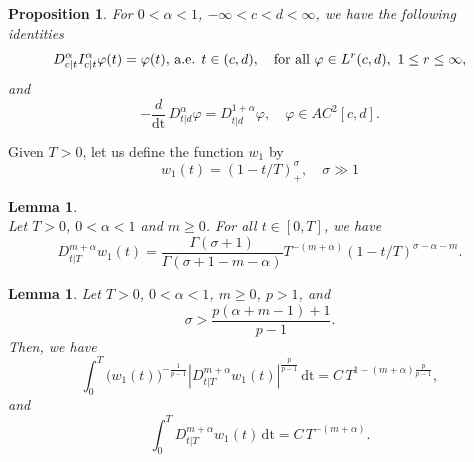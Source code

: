 \documentclass[reqno,11pt]{amsart}
\newtheorem{proposition}[theorem]{Proposition}
\newtheorem{lemma}[theorem]{Lemma}
\numberwithin{equation}{section}
\begin{document}
\begin{proposition}
	For $0<\alpha<1$, $-\infty<c<d<\infty$, we have the following identities
	\begin{equation}\label{Int3}
		D^\alpha_{c|t}I^\alpha_{c|t}\varphi(t)=\varphi(t),\,\hbox{a.e. $t\in(c,d)$}, \quad\hbox{for all}\,\,\varphi\in L^r(c,d),\,\, 1\leq r\leq\infty,
	\end{equation}
	and
	\begin{equation}\label{Int4}
		-\frac{d}{\mathrm{dt}} \, D^\alpha_{t|d}\varphi=D^{1+\alpha}_{t|d}\varphi,\quad \varphi\in AC^2[c,d].
	\end{equation}
\end{proposition}

Given $T>0$, let us define the function $w_1$ by
\begin{equation}\label{w1}
	\displaystyle w_1(t)=\left(1-t/T\right)_+^\sigma,\quad \sigma\gg1
\end{equation}
%
%
%
%
%

\begin{lemma}\cite[(2.45), p. 40]{Samko}\label{lemma1} \\
	Let $T>0$, $0<\alpha<1$ and $m\geq0$. For all $t\in[0,T]$, we have
	\begin{equation}\label{Int6}
		D_{t|T}^{m+\alpha}w_1(t)=\frac{\Gamma(\sigma+1)}{\Gamma(\sigma+1-m-\alpha)}T^{-(m+\alpha)}(1-t/T)^{\sigma-\alpha-m}.
	\end{equation}
\end{lemma}

\begin{lemma}\label{lemma2}
	Let $T>0$, $0<\alpha<1$, $m\geq0$, $p>1$, and
	$$\sigma > \frac{p(\alpha+m-1) + 1}{p-1} .$$ 
	Then, we have
	\begin{equation}\label{Int9}
		\int_0^T \big(w_1(t)\big)^{-\frac{1}{p-1}}|D_{t|T}^{m+\alpha}w_1(t)|^{\frac{p}{p-1}}\,\mathrm{dt}=C\,T^{1-(m+\alpha)\frac{p}{p-1}},
	\end{equation}
	and
	\begin{equation}\label{Int8}
		\int_0^TD_{t|T}^{m+\alpha}w_1(t)\,\mathrm{dt}= C\,T^{-(m+\alpha)}.
	\end{equation}
\end{lemma}
\end{document}

